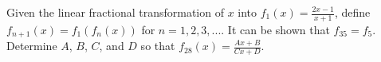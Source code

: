 Given the linear fractional transformation of $x$ into $\displaystyle{
  f_1(x) = \frac{2x - 1}{x + 1}
}$,
define $f_{n + 1}(x) = f_1(f_n(x))$ for $n = 1, 2, 3, ...$. It can be shown that $f_{35} =
f_5$. Determine $A$, $B$, $C$, and $D$ so that $\displaystyle{
  f_{28}(x) = \frac{Ax + B}{Cx + D}
}$.
